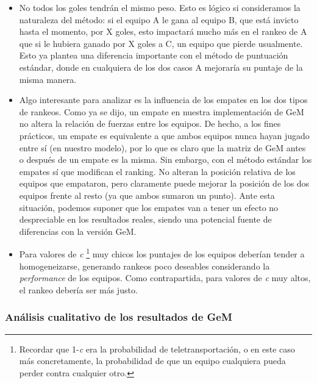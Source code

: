 \begin{itemize}
	\item No todos los goles tendrán el mismo peso. Esto es lógico si consideramos la naturaleza del método: si el equipo A le gana al equipo B, que está invicto hasta el momento, por X goles, esto impactará mucho más en el rankeo de A que si le hubiera ganado por X goles a C, un equipo que pierde usualmente. Esto ya plantea una diferencia importante con el método de puntuación estándar, donde en cualquiera de los dos casos A mejoraría su puntaje de la misma manera.

	\item Algo interesante para analizar es la influencia de los empates en los dos tipos de rankeos. Como ya se dijo, un empate en nuestra implementación de GeM no altera la relación de fuerzas entre los equipos. De hecho, a los fines prácticos, un empate es equivalente a que ambos equipos nunca hayan jugado entre sí (en nuestro modelo), por lo que es claro que la matriz de GeM antes o después de un empate es la misma. Sin embargo, con el método estándar los empates sí que modifican el ranking. No alteran la posición relativa de los equipos que empataron, pero claramente puede mejorar la posición de los dos equipos frente al resto (ya que ambos sumaron un punto). Ante esta situación, podemos suponer que los empates van a tener un efecto no despreciable en los resultados reales, siendo una potencial fuente de diferencias con la versión GeM.

	\item Para valores de \emph{c} \footnote{Recordar que 1-\emph{c} era la probabilidad de teletransportación, o en este caso más concretamente, la probabilidad de que un equipo cualquiera pueda perder contra cualquier otro.} muy chicos los puntajes de los equipos deberían tender a homogeneizarse, generando rankeos poco deseables considerando la \emph{performance} de los equipos. Como contrapartida, para valores de \emph{c} muy altos, el rankeo debería ser más justo.
\end{itemize}


\subsubsection{Análisis cualitativo de los resultados de GeM}

